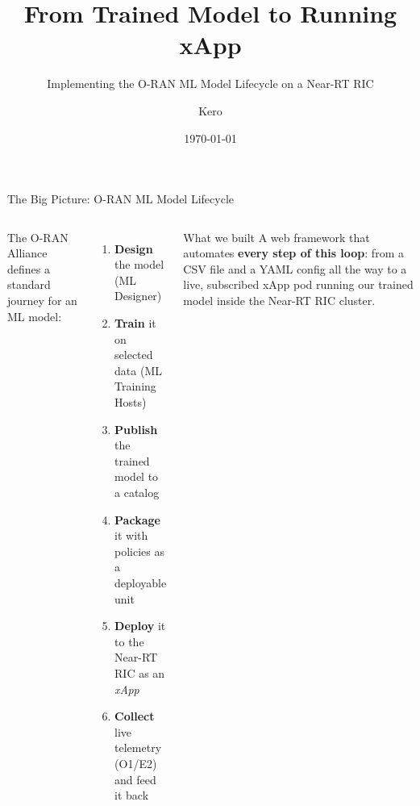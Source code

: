 \documentclass[aspectratio=169]{beamer}
\title[O-RAN ML Lifecycle]{From Trained Model to Running xApp}
\subtitle{Implementing the O-RAN ML Model Lifecycle on a Near-RT RIC}
\author{Kero}
\institute{Smart Grid Workstation 6}
\date{\today}
\begin{document}
\begin{frame}
  \titlepage
\end{frame}

\begin{frame}{The Big Picture: O-RAN ML Model Lifecycle}
  \begin{columns}
    The O-RAN Alliance defines a standard journey for an ML model:
    \begin{enumerate}
      \item \textbf{Design} the model (ML Designer)
      \item \textbf{Train} it on selected data (ML Training Hosts)
      \item \textbf{Publish} the trained model to a catalog
      \item \textbf{Package} it with policies as a deployable unit
      \item \textbf{Deploy} it to the Near-RT RIC as an \emph{xApp}
      \item \textbf{Collect} live telemetry (O1/E2) and feed it back
    \end{enumerate}
    \begin{block}{What we built}
      A web framework that automates \textbf{every step of this loop}:
      from a CSV file and a YAML config all the way to a live,
      subscribed xApp pod running our trained model inside the
      Near-RT RIC cluster.
    \end{block}
  \end{columns}
\end{frame}
\end{document}
